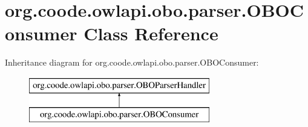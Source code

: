 \hypertarget{classorg_1_1coode_1_1owlapi_1_1obo_1_1parser_1_1_o_b_o_consumer}{\section{org.\-coode.\-owlapi.\-obo.\-parser.\-O\-B\-O\-Consumer Class Reference}
\label{classorg_1_1coode_1_1owlapi_1_1obo_1_1parser_1_1_o_b_o_consumer}
}
Inheritance diagram for org.\-coode.\-owlapi.\-obo.\-parser.\-O\-B\-O\-Consumer\-:\begin{figure}[H]
\begin{center}
\leavevmode
\includegraphics[height=2.000000cm]{classorg_1_1coode_1_1owlapi_1_1obo_1_1parser_1_1_o_b_o_consumer}
\end{center}
\end{figure}
